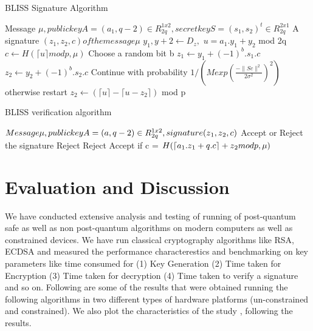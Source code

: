 \documentclass[conference]{IEEEtran}
\begin{document}
\begin{algorithm}
\caption{BLISS Signature Algorithm}
\begin{algorithmic} 
\REQUIRE Message $\mu, public key A = (a_1, q-2) \in R_{2q}^{1x2}, secret key S = (s_1,s_2)^t \in R_{2q}^{2x1}$
\ENSURE A signature $(z_1,z_2,c) of the message \mu $
\STATE $ y_1,y+2 \leftarrow D_z,$
\STATE $ u = a_1.y_1 + y_2$ mod 2q 
\STATE $ c \leftarrow H(\lceil u \rceil mod p,\mu) $
\STATE Choose a random bit b
\STATE $ z_1 \leftarrow y_1 + (-1)^b.s_1.c$
\STATE $ z_2 \leftarrow y_2 + (-1)^b.s_2.c$
\STATE  Continue with probability $ 1/(M exp\left(\frac{-\parallel Sc \parallel ^ 2}{2\sigma^2} \right)^2) $ otherwise restart
\STATE $ z_2 \leftarrow (\lceil u \rceil - \lceil u - z_2 \rceil)$ mod p 
\end{algorithmic}
\end{algorithm}

\begin{algorithm}
\caption{BLISS verification algorithm}
\begin{algorithmic} 
\REQUIRE $ Message \mu, public key A = (a,q-2) \in R_{2q}^{1x2}, signature (z\textsubscript{1},z\textsubscript{2},c)$
\ENSURE  Accept or Reject the signature 
\STATE Reject
\ENDIF
{}
\STATE Reject
\ENDIF
\STATE  Accept if c = $H(\lceil a\textsubscript{1}.z\textsubscript{1} + q.c \rceil + z\textsubscript{2} mod p, \mu) $
\end{algorithmic}
\end{algorithm}

\section{Evaluation and Discussion}

We have conducted extensive analysis and testing of running of  post-quantum safe as well as non post-quantum algorithms on modern computers as well as constrained devices. We have run classical cryptography algorithms like RSA, ECDSA and measured the performance characterestics and benchmarking on key parameters like time consumed for (1) Key Generation (2) Time taken for Encryption  (3) Time taken for decryption (4) Time taken to verify a signature and so on. Following are some of the results that were obtained running the following algorithms in two different types of hardware platforms (un-constrained and constrained). We also plot the characteristics of the study , following the results.
\end{document}
